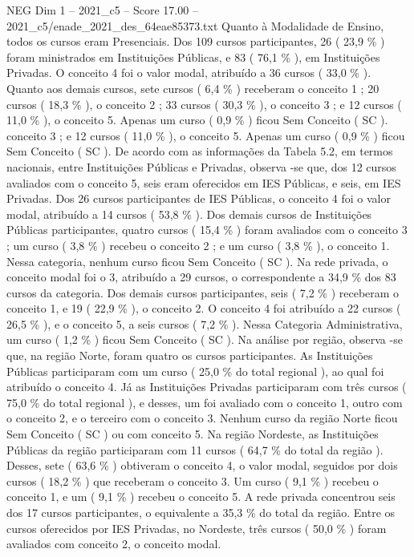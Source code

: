 \begin{textsample}{NEG Dim 1 – 2021\_c5 – Score 17.00 – 2021\_c5/enade\_2021\_des\_64eae85373.txt}
Quanto à Modalidade de Ensino, todos os cursos eram Presenciais.
Dos 109 cursos participantes, 26 ( 23,9 \% ) foram ministrados em Instituições Públicas, e 83 ( 76,1 \% ), em Instituições Privadas.
O conceito 4 foi o valor modal, atribuído a 36 cursos ( 33,0 \% ).
Quanto aos demais cursos, sete cursos ( 6,4 \% ) receberam o conceito 1 ; 20 cursos ( 18,3 \% ), o conceito 2 ; 33 cursos ( 30,3 \% ), o conceito 3 ; e 12 cursos ( 11,0 \% ), o conceito 5.
Apenas um curso ( 0,9 \% ) ficou Sem Conceito ( SC ). conceito 3 ; e 12 cursos ( 11,0 \% ), o conceito 5.
Apenas um curso ( 0,9 \% ) ficou Sem Conceito ( SC ).
De acordo com as informações da Tabela 5.2, em termos nacionais, entre Instituições Públicas e Privadas, observa -se que, dos 12 cursos avaliados com o conceito 5, seis eram oferecidos em IES Públicas, e seis, em IES Privadas.
Dos 26 cursos participantes de IES Públicas, o conceito 4 foi o valor modal, atribuído a 14 cursos ( 53,8 \% ).
Dos demais cursos de Instituições Públicas participantes, quatro cursos ( 15,4 \% ) foram avaliados com o conceito 3 ; um curso ( 3,8 \% ) recebeu o conceito 2 ; e um curso ( 3,8 \% ), o conceito 1.
Nessa categoria, nenhum curso ficou Sem Conceito ( SC ).
Na rede privada, o conceito modal foi o 3, atribuído a 29 cursos, o correspondente a 34,9 \% dos 83 cursos da categoria.
Dos demais cursos participantes, seis ( 7,2 \% ) receberam o conceito 1, e 19 ( 22,9 \% ), o conceito 2.
O conceito 4 foi atribuído a 22 cursos ( 26,5 \% ), e o conceito 5, a seis cursos ( 7,2 \% ).
Nessa Categoria Administrativa, um curso ( 1,2 \% ) ficou Sem Conceito ( SC ).
Na análise por região, observa -se que, na região Norte, foram quatro os cursos participantes.
As Instituições Públicas participaram com um curso ( 25,0 \% do total regional ), ao qual foi atribuído o conceito 4.
Já as Instituições Privadas participaram com três cursos ( 75,0 \% do total regional ), e desses, um foi avaliado com o conceito 1, outro com o conceito 2, e o terceiro com o conceito 3.
Nenhum curso da região Norte ficou Sem Conceito ( SC ) ou com conceito 5.
Na região Nordeste, as Instituições Públicas da região participaram com 11 cursos ( 64,7 \% do total da região ).
Desses, sete ( 63,6 \% ) obtiveram o conceito 4, o valor modal, seguidos por dois cursos ( 18,2 \% ) que receberam o conceito 3.
Um curso ( 9,1 \% ) recebeu o conceito 1, e um ( 9,1 \% ) recebeu o conceito 5.
A rede privada concentrou seis dos 17 cursos participantes, o equivalente a 35,3 \% do total da região.
Entre os cursos oferecidos por IES Privadas, no Nordeste, três cursos ( 50,0 \% ) foram avaliados com conceito 2, o conceito modal.

\end{textsample}
